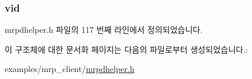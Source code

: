 \subsubsection[{\texorpdfstring{vid}{vid}}]{ vid}\hypertarget{structmrpdhelper__mvrp__notify_a98780fe4ab562a61abfd7870ea0910c3}{}\label{structmrpdhelper__mvrp__notify_a98780fe4ab562a61abfd7870ea0910c3}


mrpdhelper.\+h 파일의 117 번째 라인에서 정의되었습니다.



이 구조체에 대한 문서화 페이지는 다음의 파일로부터 생성되었습니다.\+:\begin{DoxyCompactItemize}
\item 
examples/mrp\+\_\+client/\hyperlink{mrpdhelper_8h}{mrpdhelper.\+h}\end{DoxyCompactItemize}

